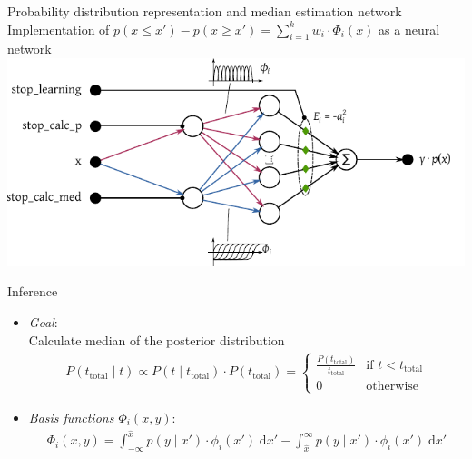 \documentclass[aspectratio=169]{beamer}
\begin{document}
\begin{frame}{Probability distribution representation and median estimation network}
	\centering
	Implementation of $p(x \leq x') - p(x \geq x') = \sum_{i = 1}^k w_i \cdot \Phi_i(x)$ as a neural network\\[0.5cm]
	\includegraphics{media/network_diagram_04.pdf}
\end{frame}

\begin{frame}{Inference}
	\begin{itemize}
		\item {\color{violet}\emph{Goal}:}\\
		Calculate median of the posterior distribution
		\begin{align*}
			P(t_\mathrm{total} \mid t)
				\propto P(t \mid t_\mathrm{total}) \cdot P(t_\mathrm{total})
				= \begin{cases}
				    \frac{P(t_\mathrm{total})}{t_\mathrm{total}} & \text{if } t < t_\mathrm{total} \\
				    0 & \text{otherwise}
				   \end{cases}
		\end{align*}
		\item {\color{violet}\emph{Basis functions $\Phi_i(x, y)$}:}\\
		\begin{align*}
			\Phi_i(x, y) =
				\int_{-\infty}^{\hat{x}}
					p(y \mid x') \cdot \phi_i(x') \; \mathrm{d}x' -
				\int_{\hat{x}}^{\infty}
					p(y \mid x') \cdot \phi_i(x') \; \mathrm{d}x'
		\end{align*}
	\end{itemize}
\end{frame}
\end{document}
